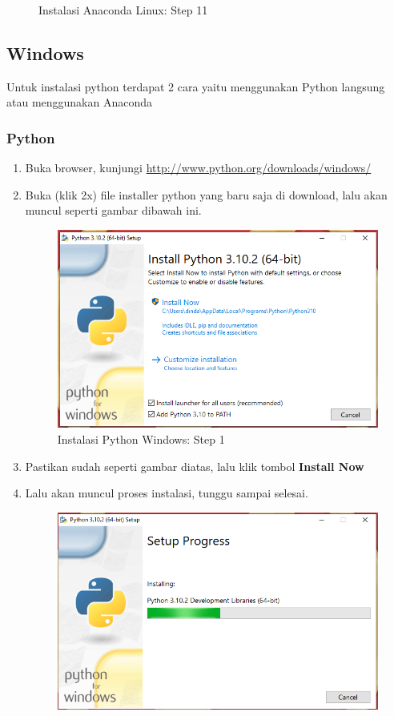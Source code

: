 \begin{enumerate}
\begin{figure}[H]
        \caption{Instalasi Anaconda Linux: Step 11}
\end{figure}
\end{enumerate}



\subsection{Windows}
Untuk instalasi python terdapat 2 cara yaitu menggunakan Python langsung atau menggunakan Anaconda

\subsubsection{Python}
\begin{enumerate}
\item Buka browser, kunjungi \url{http://www.python.org/downloads/windows/}
\item Buka (klik 2x) file installer python yang baru saja di download, lalu akan muncul seperti gambar dibawah ini.
\begin{figure}[H]
        \centerline{\includegraphics[scale=0.75]{figures/instalasi-python-windows/step1}}
        \caption{Instalasi Python Windows: Step 1}
\end{figure}
\item Pastikan sudah seperti gambar diatas, lalu klik tombol \textbf{Install Now}
\item Lalu akan muncul proses instalasi, tunggu sampai selesai.
\begin{figure}[H]
        \centerline{\includegraphics[scale=0.75]{figures/instalasi-python-windows/step2}}

\end{figure}
\end{enumerate}
